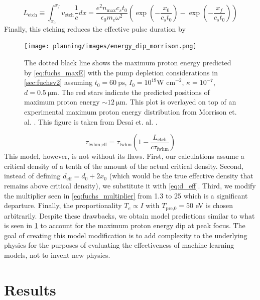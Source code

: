 \begin{equation}
	L_\text{etch} \equiv \int_{x_0}^{x_f} v_\text{etch} \frac{1}{c} dx = \frac{e^2 n_\text{max} c_s t_0}{\epsilon_0 m_e \omega^2} \left( \exp{\left(-\frac{x_0}{c_s t_0}\right)} - \exp{\left(-\frac{x_f}{c_s t_0}\right)} \right)
\end{equation}
Finally, this etching reduces the effective pulse duration by 

\begin{figure}
	\centering 
	\texttt{[image: planning/images/energy\_dip\_morrison.png]}
	\caption{The dotted black line shows the maximum proton energy predicted by \cref{eq:fuchs_maxE} with the pump depletion considerations in \cref{sec:fuchsv2} assuming $t_0 = \SI{60}{\pico \second}$, $I_0 = 10^{19} \text{W cm}^{-2}$, $\kappa=10^{-7}$, $d=\SI{0.5}{\micro \meter}$. The red stars indicate the predicted positions of maximum proton energy $\sim \SI{12}{\micro \meter}$. This plot is overlayed on top of an experimental maximum proton energy distribution from Morrison et. al. \cite{Morrison_2018_NJoP}. This figure is taken from Desai et. al. \cite{Desai_2024_arX}.}
	\label{fig:energy_dip_morrison}
\end{figure}
\begin{equation}
	\tau_\text{fwhm,eff} = \tau_\text{fwhm} (1 - \frac{L_\text{etch}}{c \tau_\text{fwhm}}) \label{eq:tau_etch}
\end{equation}
This model, however, is not without its flaws. First, our calculations assume a critical density of a tenth of the amount of the actual critical density. Second, instead of defining $d_\text{eff} = d_0 + 2 x_0$ (which would be the true effective density that remains above critical density), we substitute it with \cref{eq:d_eff}. Third, we modify the multiplier seen in \cref{eq:fuchs_multiplier} from 1.3 to 25 which is a significant departure. Finally, the proportionality $T_e \propto I$ with $T_\text{pre,0} = 50$ eV is chosen arbitrarily. Despite these drawbacks, we obtain model predictions similar to what is seen in \cref{fig:energy_dip_morrison} to account for the maximum proton energy dip at peak focus. The goal of creating this model modification is to add complexity to the underlying physics for the purposes of evaluating the effectiveness of machine learning models, not to invent new physics. 

\section{Results}

